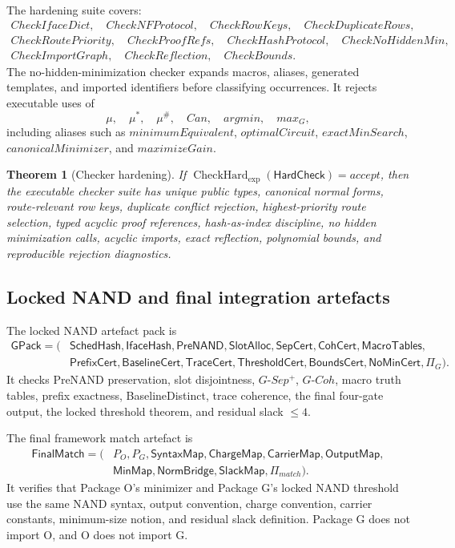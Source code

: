 \documentclass[10.5pt,a4paper]{article}
\newtheorem{theorem}{Theorem}[section]
\newcommand{\IfaceHash}{\mathsf{IfaceHash}}
\newcommand{\CheckHard}{\operatorname{CheckHard}_{\exp}}
\begin{document}
The hardening suite covers:
\[
\begin{gathered}
CheckIfaceDict,\quad CheckNFProtocol,\quad CheckRowKeys,\quad CheckDuplicateRows,\\
CheckRoutePriority,\quad CheckProofRefs,\quad CheckHashProtocol,\quad CheckNoHiddenMin,\\
CheckImportGraph,\quad CheckReflection,\quad CheckBounds.
\end{gathered}
\]
The no-hidden-minimization checker expands macros, aliases, generated templates, and imported identifiers before classifying occurrences.  It rejects executable uses of
\[
\mu,
\quad \mu^*,
\quad \mu^\#,
\quad Can,
\quad argmin,
\quad max_G,
\]
including aliases such as \(minimumEquivalent\), \(optimalCircuit\), \(exactMinSearch\), \(canonicalMinimizer\), and \(maximizeGain\).

\begin{theorem}[Checker hardening]
If \(\CheckHard(\mathsf{HardCheck})=accept\), then the executable checker suite has unique public types, canonical normal forms, route-relevant row keys, duplicate conflict rejection, highest-priority route selection, typed acyclic proof references, hash-as-index discipline, no hidden minimization calls, acyclic imports, exact reflection, polynomial bounds, and reproducible rejection diagnostics.
\end{theorem}

\subsection{Locked NAND and final integration artefacts}
The locked NAND artefact pack is
\[
\begin{aligned}
\mathsf{GPack}=(&\mathsf{SchedHash},\IfaceHash,\mathsf{PreNAND},\mathsf{SlotAlloc},\mathsf{SepCert},\mathsf{CohCert},\mathsf{MacroTables},\\
&\mathsf{PrefixCert},\mathsf{BaselineCert},\mathsf{TraceCert},\mathsf{ThresholdCert},\mathsf{BoundsCert},\mathsf{NoMinCert},\Pi_G).
\end{aligned}
\]
It checks PreNAND preservation, slot disjointness, \(G\text{-}Sep^+\), \(G\text{-}Coh\), macro truth tables, prefix exactness, BaselineDistinct, trace coherence, the final four-gate output, the locked threshold theorem, and residual slack \(\le4\).

The final framework match artefact is
\[
\begin{aligned}
\mathsf{FinalMatch}=(&P_O,P_G,\mathsf{SyntaxMap},\mathsf{ChargeMap},\mathsf{CarrierMap},\mathsf{OutputMap},\\
&\mathsf{MinMap},\mathsf{NormBridge},\mathsf{SlackMap},\Pi_{match}).
\end{aligned}
\]
It verifies that Package O's minimizer and Package G's locked NAND threshold use the same NAND syntax, output convention, charge convention, carrier constants, minimum-size notion, and residual slack definition.  Package G does not import O, and O does not import G.
\end{document}
